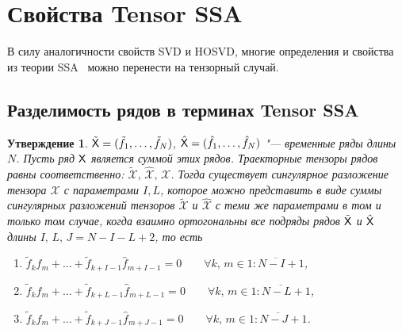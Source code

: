 \documentclass[specialist,
    substylefile = spbu_report.rtx,
    subf,href,colorlinks=true, 12pt]{disser}
\theoremstyle{plain}
\newtheorem{statement}{Утверждение}[section]
\theoremstyle{definition}
\theoremstyle{remark}
\begin{document}
    \section{Свойства Tensor SSA}\label{sec:Tensor SSA-properties}
    В силу аналогичности свойств SVD и HOSVD, многие определения и свойства из теории SSA~\cite{ssa} можно перенести на тензорный случай.

    \subsection{Разделимость рядов в терминах Tensor SSA}\label{subsec:tensor-ssa-separability}
    \begin{statement}
        \label{state:separability}
        $\tilde{\mathsf{X}}=(\tilde{f}_1,\ldots , \tilde{f}_N)$, $\hat{\mathsf{X}}=(\hat{f}_1,\ldots , \hat{f}_N)$ "--- временные ряды длины $N$.
        Пусть ряд $\mathsf{X}$ является суммой этих рядов.
        Траекторные тензоры рядов равны соответственно: $\tilde{\mathcal{X}},\, \hat{\mathcal{X}},\, \mathcal{X}$.
        Тогда существует сингулярное разложение тензора $\mathcal{X}$ с параметрами $I, L$, которое можно представить
        в виде суммы сингулярных разложений тензоров $\tilde{\mathcal{X}}$ и $\hat{\mathcal{X}}$ с теми же параметрами
        в том и только том случае, когда взаимно ортогональны все подряды рядов $\tilde{\mathsf{X}}$ и $\hat{\mathsf{X}}$
        длины $I,\, L,\, J=N-I-L+2$, то есть
        \begin{enumerate}
            \item $\tilde{f}_{k}\hat{f}_m + \ldots + \tilde{f}_{k+I-1} \hat{f}_{m+I-1}=0 \qquad \forall k,\, m\in\overline{1:N-I+1}$,
            \item $\tilde{f}_{k}\hat{f}_m + \ldots + \tilde{f}_{k+L-1} \hat{f}_{m+L-1}=0 \qquad \forall k,\, m\in\overline{1:N-L+1}$,
            \item $\tilde{f}_{k}\hat{f}_m + \ldots + \tilde{f}_{k+J-1} \hat{f}_{m+J-1}=0 \qquad \forall k,\, m\in\overline{1:N-J+1}$.
        \end{enumerate}
    \end{statement}
\end{document}
